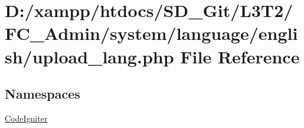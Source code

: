 \hypertarget{upload__lang_8php}{}\section{D\+:/xampp/htdocs/\+S\+D\+\_\+\+Git/\+L3\+T2/\+F\+C\+\_\+\+Admin/system/language/english/upload\+\_\+lang.php File Reference}
\label{upload__lang_8php}
\subsection*{Namespaces}
\begin{DoxyCompactItemize}
\item 
 \hyperlink{namespace_code_igniter}{Code\+Igniter}
\end{DoxyCompactItemize}
